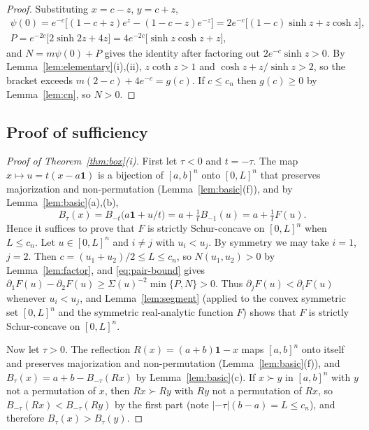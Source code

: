 \documentclass[11pt,a4paper]{article}
\theoremstyle{plain}
\theoremstyle{definition}
\newcommand{\one}{\mathbf{1}}
\newcommand{\maj}{\succ}
\begin{document}
\begin{proof}
Substituting $x=c-z$, $y=c+z$,
\begin{gather*}
\psi(0)=e^{-c}\bigl[(1-c+z)e^{z}-(1-c-z)e^{-z}\bigr]=2e^{-c}\bigl[(1-c)\sinh z+z\cosh z\bigr],\\
P=e^{-2c}\bigl[2\sinh 2z+4z\bigr]=4e^{-2c}\bigl[\sinh z\cosh z+z\bigr],
\end{gather*}
and $N=m\psi(0)+P$ gives the identity after factoring out $2e^{-c}\sinh z>0$. By Lemma~\ref{lem:elementary}(i),(ii), $z\coth z>1$ and $\cosh z+z/\sinh z>2$, so the bracket exceeds $m(2-c)+4e^{-c}=g(c)$. If $c\le c_n$ then $g(c)\ge 0$ by Lemma~\ref{lem:cn}, so $N>0$.
\end{proof}

\subsection{Proof of sufficiency}

\begin{proof}[Proof of Theorem~\ref{thm:box}(i)]
First let $\tau<0$ and $t=-\tau$. The map $x\mapsto u=t(x-a\one)$ is a bijection of $[a,b]^n$ onto $[0,L]^n$ that preserves majorization and non-permutation (Lemma~\ref{lem:basic}(f)), and by Lemma~\ref{lem:basic}(a),(b),
\begin{equation}\label{eq:reduction}
B_\tau(x)=B_{-t}\bigl(a\one+u/t\bigr)=a+\tfrac1t B_{-1}(u)=a+\tfrac1t F(u).
\end{equation}
Hence it suffices to prove that $F$ is strictly Schur-concave on $[0,L]^n$ when $L\le c_n$. Let $u\in[0,L]^n$ and $i\ne j$ with $u_i<u_j$. By symmetry we may take $i=1$, $j=2$. Then $c=(u_1+u_2)/2\le L\le c_n$, so $N(u_1,u_2)>0$ by Lemma~\ref{lem:factor}, and \eqref{eq:pair-bound} gives $\partial_1F(u)-\partial_2F(u)\ge \Sigma(u)^{-2}\min\{P,N\}>0$. Thus $\partial_jF(u)<\partial_iF(u)$ whenever $u_i<u_j$, and Lemma~\ref{lem:segment} (applied to the convex symmetric set $[0,L]^n$ and the symmetric real-analytic function $F$) shows that $F$ is strictly Schur-concave on $[0,L]^n$.

Now let $\tau>0$. The reflection $R(x)=(a+b)\one-x$ maps $[a,b]^n$ onto itself and preserves majorization and non-permutation (Lemma~\ref{lem:basic}(f)), and $B_\tau(x)=a+b-B_{-\tau}(Rx)$ by Lemma~\ref{lem:basic}(c). If $x\maj y$ in $[a,b]^n$ with $y$ not a permutation of $x$, then $Rx\maj Ry$ with $Ry$ not a permutation of $Rx$, so $B_{-\tau}(Rx)<B_{-\tau}(Ry)$ by the first part (note $|{-\tau}|(b-a)=L\le c_n$), and therefore $B_\tau(x)>B_\tau(y)$.
\end{proof}
\end{document}
